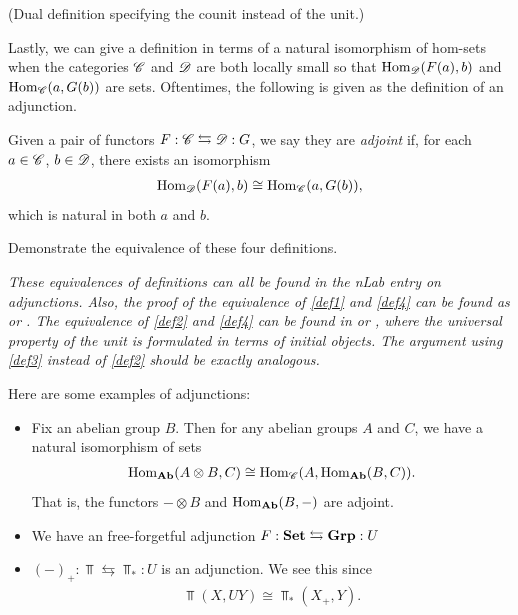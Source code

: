 \documentclass{article}[11pt]
\begin{document}
\begin{definition}\label{def3}
(Dual definition specifying the counit instead of the unit.)
\end{definition} 

Lastly, we can give a definition in terms of a natural isomorphism of hom-sets when the categories $\mathscr{C}$ and $\mathscr{D}$ are both locally small so that $\textup{Hom}_{\mathscr{D}}(F(a),b)$ and $\textup{Hom}_{\mathscr{C}}(a,G(b))$ are sets. Oftentimes, the following is given as the definition of an adjunction.

\begin{definition}\label{def4} Given a pair of functors $F: \mathscr{C} \leftrightarrows \mathscr{D}:G$, we say they are \textit{adjoint} if, for each $a\in \mathscr{C}$, $b\in\mathscr{D}$, there exists an isomorphism
\begin{align*}
	\textup{Hom}_{\mathscr{D}}(F(a), b) \cong \textup{Hom}_{\mathscr{C}} (a, G(b)),
\end{align*}
which is natural in both $a$ and $b$.
\end{definition}

\begin{exercise} Demonstrate the equivalence of these four definitions. 
\end{exercise}
\emph{These equivalences of definitions can all be found in the nLab entry on adjunctions. Also, the proof of the equivalence of \autoref{def1} and \autoref{def4} can be found as  \cite[Theorem 2.2.5]{leinster} or \cite[Theorem 3.9]{mehrle}. The equivalence of \autoref{def2} and \autoref{def4} can be found in \cite[Section 3]{henderson} or \cite[Theorem 2.3.6.]{leinster}, where the universal property of the unit is formulated in terms of initial objects. The argument using \autoref{def3} instead of \autoref{def2} should be exactly analogous.}



Here are some examples of adjunctions:
\begin{itemize}
	\item Fix an abelian group $B$. Then for any abelian groups $A$ and $C$, we have a natural isomorphism of sets
\begin{align*}
	\textup{Hom}_{\textbf{Ab}} (A\otimes B, C) \cong \textup{Hom}_{\mathscr{C}}(A, \textup{Hom}_{\textbf{Ab}} (B,C)).
\end{align*}
That is, the functors $-\otimes B$ and $\textup{Hom}_{\textbf{Ab}} (B, -)$ are adjoint.
	\item We have an free-forgetful adjunction $F: \textbf{Set} \leftrightarrows \textbf{Grp} : U$
	\item $(-)_+ : \Top \leftrightarrows \Top_\ast: U$ is an adjunction. We see this since
	\begin{align*}
		\Top(X,UY) \cong \Top_\ast (X_+, Y).
	\end{align*}
\end{itemize}
\end{document}

